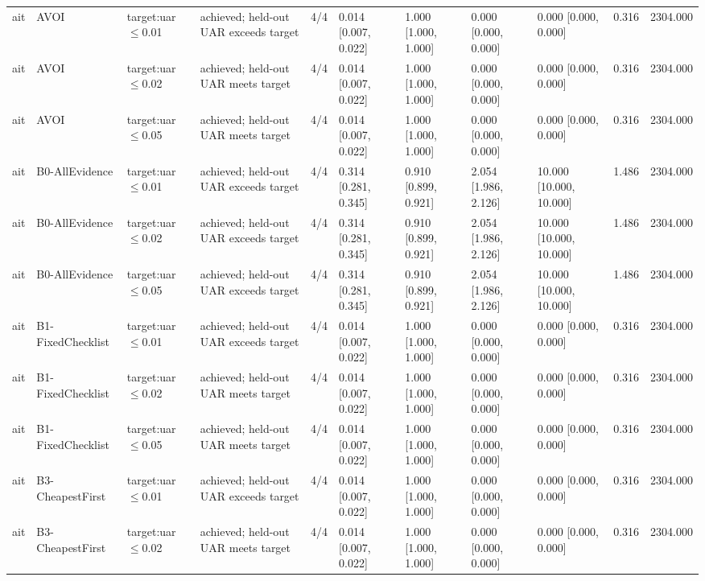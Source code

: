 \begin{table}[!ht]
{\begin{tabular}{lllllllllll}
ait & AVOI & target:uar$\le$0.01 & achieved; held-out UAR exceeds target & 4/4 & 0.014 [0.007, 0.022] & 1.000 [1.000, 1.000] & 0.000 [0.000, 0.000] & 0.000 [0.000, 0.000] & 0.316 & 2304.000 \\
ait & AVOI & target:uar$\le$0.02 & achieved; held-out UAR meets target & 4/4 & 0.014 [0.007, 0.022] & 1.000 [1.000, 1.000] & 0.000 [0.000, 0.000] & 0.000 [0.000, 0.000] & 0.316 & 2304.000 \\
ait & AVOI & target:uar$\le$0.05 & achieved; held-out UAR meets target & 4/4 & 0.014 [0.007, 0.022] & 1.000 [1.000, 1.000] & 0.000 [0.000, 0.000] & 0.000 [0.000, 0.000] & 0.316 & 2304.000 \\
ait & B0-AllEvidence & target:uar$\le$0.01 & achieved; held-out UAR exceeds target & 4/4 & 0.314 [0.281, 0.345] & 0.910 [0.899, 0.921] & 2.054 [1.986, 2.126] & 10.000 [10.000, 10.000] & 1.486 & 2304.000 \\
ait & B0-AllEvidence & target:uar$\le$0.02 & achieved; held-out UAR exceeds target & 4/4 & 0.314 [0.281, 0.345] & 0.910 [0.899, 0.921] & 2.054 [1.986, 2.126] & 10.000 [10.000, 10.000] & 1.486 & 2304.000 \\
ait & B0-AllEvidence & target:uar$\le$0.05 & achieved; held-out UAR exceeds target & 4/4 & 0.314 [0.281, 0.345] & 0.910 [0.899, 0.921] & 2.054 [1.986, 2.126] & 10.000 [10.000, 10.000] & 1.486 & 2304.000 \\
ait & B1-FixedChecklist & target:uar$\le$0.01 & achieved; held-out UAR exceeds target & 4/4 & 0.014 [0.007, 0.022] & 1.000 [1.000, 1.000] & 0.000 [0.000, 0.000] & 0.000 [0.000, 0.000] & 0.316 & 2304.000 \\
ait & B1-FixedChecklist & target:uar$\le$0.02 & achieved; held-out UAR meets target & 4/4 & 0.014 [0.007, 0.022] & 1.000 [1.000, 1.000] & 0.000 [0.000, 0.000] & 0.000 [0.000, 0.000] & 0.316 & 2304.000 \\
ait & B1-FixedChecklist & target:uar$\le$0.05 & achieved; held-out UAR meets target & 4/4 & 0.014 [0.007, 0.022] & 1.000 [1.000, 1.000] & 0.000 [0.000, 0.000] & 0.000 [0.000, 0.000] & 0.316 & 2304.000 \\
ait & B3-CheapestFirst & target:uar$\le$0.01 & achieved; held-out UAR exceeds target & 4/4 & 0.014 [0.007, 0.022] & 1.000 [1.000, 1.000] & 0.000 [0.000, 0.000] & 0.000 [0.000, 0.000] & 0.316 & 2304.000 \\
ait & B3-CheapestFirst & target:uar$\le$0.02 & achieved; held-out UAR meets target & 4/4 & 0.014 [0.007, 0.022] & 1.000 [1.000, 1.000] & 0.000 [0.000, 0.000] & 0.000 [0.000, 0.000] & 0.316 & 2304.000 \\

\end{tabular}}
\end{table}
